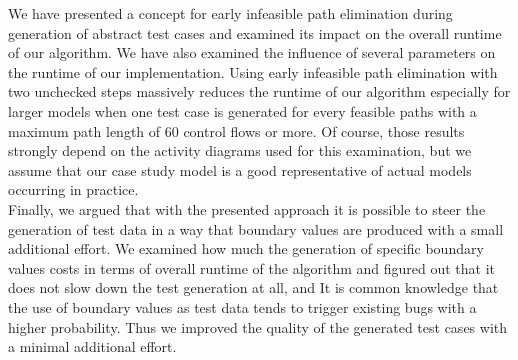 We have presented a concept for early infeasible path elimination during generation of abstract test cases and examined its impact on the overall runtime of our algorithm. We have also examined the influence of several parameters on the runtime of our implementation. Using early infeasible path elimination with two unchecked steps massively reduces the runtime of our algorithm especially for larger models when one test case is generated for every feasible paths with a maximum path length of 60 control flows or more. Of course, those results strongly depend on the activity diagrams used for this examination, but we assume that our case study model is a good representative of actual models occurring in practice.\\
Finally, we argued that with the presented approach it is possible to steer the generation of test data in a way that boundary values are produced with a small additional effort. 
We examined how much the generation of specific boundary values costs in terms of overall runtime of the algorithm and figured out that it does not slow down the test generation at all, and 
It is common knowledge that the use of boundary values as test data tends to trigger existing bugs with a higher probability. Thus we improved the quality of the generated test cases with a minimal additional effort.

